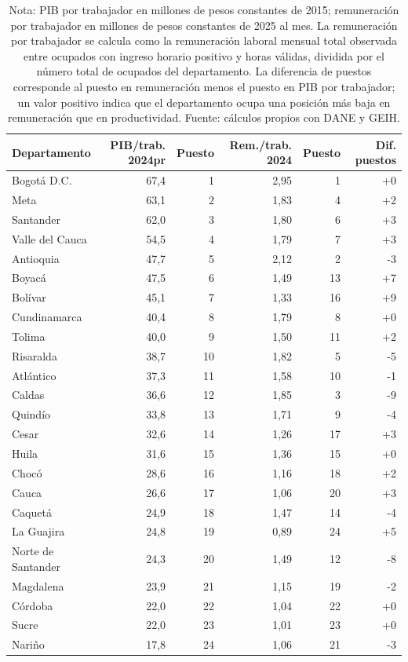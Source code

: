 \begin{table}[H]
\centering
\caption{Ranking departamental de PIB por trabajador y remuneraci\'on por trabajador, 2024pr}
\label{tab:pib_geih_productividad_departamento_remuneracion}
\scriptsize
\begin{tabular}{lrrrrr}
\toprule
Departamento & PIB/trab. 2024pr & Puesto & Rem./trab. 2024 & Puesto & Dif. puestos \\
\midrule
Bogotá D.C. & 67,4 & 1 & 2,95 & 1 & +0 \\
Meta & 63,1 & 2 & 1,83 & 4 & +2 \\
Santander & 62,0 & 3 & 1,80 & 6 & +3 \\
Valle del Cauca & 54,5 & 4 & 1,79 & 7 & +3 \\
Antioquia & 47,7 & 5 & 2,12 & 2 & -3 \\
Boyacá & 47,5 & 6 & 1,49 & 13 & +7 \\
Bolívar & 45,1 & 7 & 1,33 & 16 & +9 \\
Cundinamarca & 40,4 & 8 & 1,79 & 8 & +0 \\
Tolima & 40,0 & 9 & 1,50 & 11 & +2 \\
Risaralda & 38,7 & 10 & 1,82 & 5 & -5 \\
Atlántico & 37,3 & 11 & 1,58 & 10 & -1 \\
Caldas & 36,6 & 12 & 1,85 & 3 & -9 \\
Quindío & 33,8 & 13 & 1,71 & 9 & -4 \\
Cesar & 32,6 & 14 & 1,26 & 17 & +3 \\
Huila & 31,6 & 15 & 1,36 & 15 & +0 \\
Chocó & 28,6 & 16 & 1,16 & 18 & +2 \\
Cauca & 26,6 & 17 & 1,06 & 20 & +3 \\
Caquetá & 24,9 & 18 & 1,47 & 14 & -4 \\
La Guajira & 24,8 & 19 & 0,89 & 24 & +5 \\
Norte de Santander & 24,3 & 20 & 1,49 & 12 & -8 \\
Magdalena & 23,9 & 21 & 1,15 & 19 & -2 \\
Córdoba & 22,0 & 22 & 1,04 & 22 & +0 \\
Sucre & 22,0 & 23 & 1,01 & 23 & +0 \\
Nariño & 17,8 & 24 & 1,06 & 21 & -3 \\
\bottomrule
\end{tabular}
\caption*{\footnotesize Nota: PIB por trabajador en millones de pesos constantes de 2015; remuneraci\'on por trabajador en millones de pesos constantes de 2025 al mes. La remuneraci\'on por trabajador se calcula como la remuneraci\'on laboral mensual total observada entre ocupados con ingreso horario positivo y horas v\'alidas, dividida por el n\'umero total de ocupados del departamento. La diferencia de puestos corresponde al puesto en remuneraci\'on menos el puesto en PIB por trabajador; un valor positivo indica que el departamento ocupa una posici\'on m\'as baja en remuneraci\'on que en productividad. Fuente: c\'alculos propios con DANE y GEIH.}
\end{table}